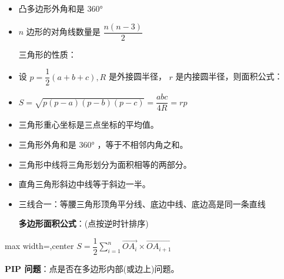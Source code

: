 \documentclass[twocolumn,10pt]{ctexart}
\begin{document}
\begin{itemize}
\item 凸多边形外角和是 $360°$
\end{itemize}

\begin{itemize}
\item $n$ 边形的对角线数量是 $\dfrac{n(n-3)}2$

三角形的性质：
\end{itemize}

\begin{itemize}
\item 设 $p=\dfrac12(a+b+c),R$ 是外接圆半径， $r$ 是内接圆半径，则面积公式：
\end{itemize}

\begin{itemize}
\item $S=\sqrt{p(p-a)(p-b)(p-c)}=\dfrac{abc}{4R}=rp$
\end{itemize}

\begin{itemize}
\item 三角形重心坐标是三点坐标的平均值。
\end{itemize}

\begin{itemize}
\item 三角形外角和是 $360°$ ，等于不相邻内角之和。
\end{itemize}

\begin{itemize}
\item 三角形中线将三角形划分为面积相等的两部分。
\end{itemize}

\begin{itemize}
\item 直角三角形斜边中线等于斜边一半。
\end{itemize}

\begin{itemize}
\item 三线合一：等腰三角形顶角平分线、底边中线、底边高是同一条直线

\textbf{多边形面积公式}：(点按逆时针排序)
\end{itemize}

\begin{adjustbox}{max width=\linewidth,center}
$S=\dfrac12\sum_{i=1}^n\vec{OA_i}\times \vec{OA_{i+1}}$
\end{adjustbox}

\textbf{PIP 问题}：点是否在多边形内部(或边上)问题。
\end{document}
